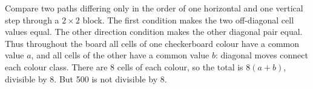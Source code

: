 Compare two paths differing only in the order of one horizontal and one vertical step through a $2\times2$ block. The first condition makes the two off-diagonal cell values equal. The other direction condition makes the other diagonal pair equal. Thus throughout the board all cells of one checkerboard colour have a common value $a$, and all cells of the other have a common value $b$: diagonal moves connect each colour class. There are 8 cells of each colour, so the total is $8(a+b)$, divisible by 8. But 500 is not divisible by 8.
